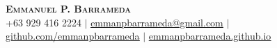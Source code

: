 \documentclass[legal,10pt]{article}
\begin{document}

\begin{center}
    \textbf{\Huge \scshape Emmanuel P. Barrameda} \\ \vspace{1pt}
    \small +63 929 416 2224 $|$ \href{mailto:emmanpbarrameda@gmail.com}{\underline{emmanpbarrameda@gmail.com}} $|$ 
    \href{https://github.com/emmanpbarrameda}{\underline{github.com/emmanpbarrameda}} $|$
    \href{https://emmanpbarrameda.github.io/}{\underline{emmanpbarrameda.github.io}}
\end{center}




\end{document}
